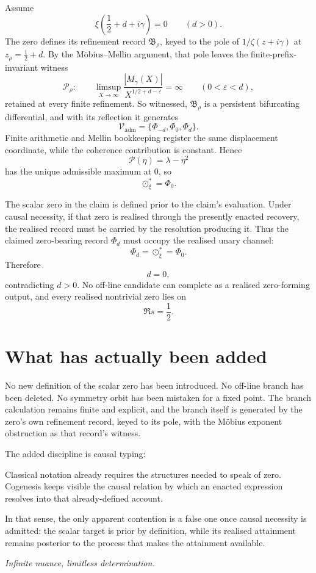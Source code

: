 \documentclass[11pt]{article}
\newcommand{\Pheart}{\mathcal P}
\begin{document}
Assume
\[
\xi\!\left(\frac12+d+i\gamma\right)=0
\qquad(d>0).
\]
The zero defines its refinement record \(\mathfrak B_\rho\), keyed to the pole of \(1/\zeta(z+i\gamma)\) at \(z_\rho=\frac12+d\). By the M\"obius--Mellin argument, that pole leaves the finite-prefix-invariant witness
\[
\mathcal P_\rho:
\qquad
\limsup_{X\to\infty}
\frac{|M_\gamma(X)|}{X^{1/2+d-\varepsilon}}
=
\infty
\qquad(0<\varepsilon<d),
\]
retained at every finite refinement. So witnessed, \(\mathfrak B_\rho\) is a persistent bifurcating differential, and with its reflection it generates
\[
\mathcal V_{\mathrm{adm}}
=
\{\Phi_{-d},\Phi_0,\Phi_d\}.
\]
Finite arithmetic and Mellin bookkeeping register the same displacement coordinate, while the coherence contribution is constant. Hence
\[
\Pheart(\eta)=\lambda-\eta^2
\]
has the unique admissible maximum at \(0\), so
\[
\odot_\xi^\ast=\Phi_0.
\]

The scalar zero in the claim is defined prior to the claim's evaluation. Under causal necessity, if that zero is realised through the presently enacted recovery, the realised record must be carried by the resolution producing it. Thus the claimed zero-bearing record \(\Phi_d\) must occupy the realised unary channel:
\[
\Phi_d=\odot_\xi^\ast=\Phi_0.
\]
Therefore
\[
d=0,
\]
contradicting \(d>0\). No off-line candidate can complete as a realised zero-forming output, and every realised nontrivial zero lies on
\[
\Re s=\frac12.
\]

\section{What has actually been added}

No new definition of the scalar zero has been introduced. No off-line branch has been deleted. No symmetry orbit has been mistaken for a fixed point. The branch calculation remains finite and explicit, and the branch itself is generated by the zero's own refinement record, keyed to its pole, with the M\"obius exponent obstruction as that record's witness.

The added discipline is causal typing:

\medskip
\noindent
{}
\medskip

Classical notation already requires the structures needed to speak of zero. Cogenesis keeps visible the causal relation by which an enacted expression resolves into that already-defined account.

In that sense, the only apparent contention is a false one once causal necessity is admitted: the scalar target is prior by definition, while its realised attainment remains posterior to the process that makes the attainment available.

\begin{center}
\vspace{1.15em}
\emph{Infinite nuance, limitless determination.}
\end{center}
\end{document}
